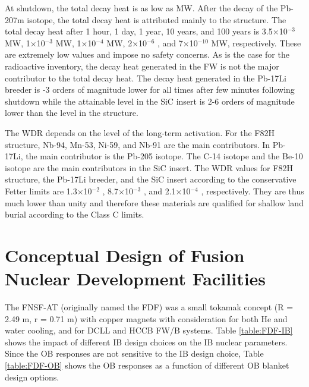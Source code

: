 At shutdown, the total decay heat is as low as  MW. After the
decay of the Pb-207m isotope, the total decay heat is attributed mainly to the
structure. The total decay heat after 1 hour, 1 day, 1 year, 10 years, and 100
years is 3.5$\times$10$^{-3}$ MW, 1$\times$10$^{-3}$ MW, 1$\times$10$^{-4}$ MW,
2$\times$10$^{-6}$ , and 7$\times$10$^{-10}$ MW, respectively. These are
extremely low values and impose no safety concerns. As is the case for the
radioactive inventory, the decay heat generated in the \gls{FW} is not the
major contributor to the total decay heat. The decay heat generated in the
Pb-17Li breeder is -3 orders of magnitude lower for all times
after few minutes following shutdown while the attainable level in the SiC
insert is 2-6 orders of magnitude lower than the level in the structure.

The \gls{WDR} depends on the level of the long-term activation. For the F82H
structure, Nb-94, Mn-53, Ni-59, and Nb-91 are the main contributors. In Pb-
17Li, the main contributor is the Pb-205 isotope. The C-14 isotope and the
Be-10 isotope are the main contributors in the SiC insert. The \gls{WDR}
values for F82H structure, the Pb-17Li breeder, and the SiC insert according
to the conservative Fetter limits are 1.3$\times$10$^{-2}$ ,
8.7$\times$10$^{-3}$ , and 2.1$\times$10$^{-4}$ , respectively. They are thus
much lower than unity and therefore these materials are qualified for shallow
land burial according to the Class C limits.


\section{Conceptual Design of Fusion Nuclear Development Facilities}

The \gls{FNSF-AT} (originally named the \gls{FDF}) was a small tokamak
concept (R = 2.49 m, r = 0.71 m) with copper magnets with consideration for
both He and water cooling, and for \gls{DCLL} and \gls{HCCB} \gls{FW/B}
systems.  Table \ref{table:FDF-IB} shows the impact of different \gls{IB}
design choices on the \gls{IB} nuclear parameters.  Since the \gls{OB}
responses are not sensitive to the \gls{IB} design choice, Table
\ref{table:FDF-OB} shows the \gls{OB} responses as a function of different
\gls{OB} blanket design options.

